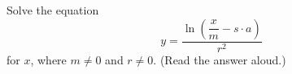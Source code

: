 Solve the equation
\[
y=\dfrac{\ln\left(\dfrac {x}{m}-s\cdot a\right)}{r^2}
\]
for $x$, where $m\ne0$ and $r\ne0$. (Read the answer aloud.)
